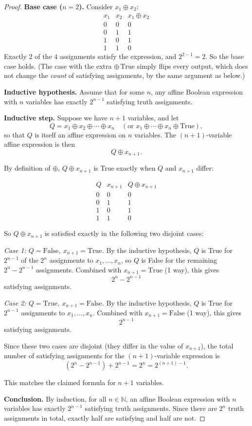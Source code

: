 \documentclass[11pt]{article}
\begin{document}
\begin{proof}
\textbf{Base case ($n=2$).} Consider $x_1\oplus x_2$:
\[
\begin{array}{cc|c}
x_1 & x_2 & x_1\oplus x_2\\
\hline
0&0&0\\
0&1&1\\
1&0&1\\
1&1&0
\end{array}
\]
Exactly $2$ of the $4$ assignments satisfy the expression, and $2^{2-1}=2$. So the base case holds. (The case with the extra $\oplus\,\text{True}$ simply flips every output, which does not change the \emph{count} of satisfying assignments, by the same argument as below.)

\bigskip
\noindent\textbf{Inductive hypothesis.} Assume that for some $n$, any affine Boolean expression with $n$ variables has exactly $2^{n-1}$ satisfying truth assignments.

\bigskip
\noindent\textbf{Inductive step.} Suppose we have $n+1$ variables, and let
\[
Q = x_1\oplus x_2\oplus\cdots\oplus x_n \quad(\text{or } x_1\oplus\cdots\oplus x_n\oplus\text{True}),
\]
so that $Q$ is itself an affine expression on $n$ variables. The $(n+1)$-variable affine expression is then
\[
Q\oplus x_{n+1}.
\]

By definition of $\oplus$, $Q\oplus x_{n+1}$ is True exactly when $Q$ and $x_{n+1}$ differ:

\[
\begin{array}{cc|c}
Q & x_{n+1} & Q\oplus x_{n+1}\\
\hline
0&0&0\\
0&1&1\\
1&0&1\\
1&1&0
\end{array}
\]

So $Q\oplus x_{n+1}$ is satisfied exactly in the following two disjoint cases:

\smallskip
\noindent\textit{Case 1: $Q=\text{False}$, $x_{n+1}=\text{True}$.} By the inductive hypothesis, $Q$ is True for $2^{n-1}$ of the $2^n$ assignments to $x_1,\dots,x_n$, so $Q$ is False for the remaining $2^n-2^{n-1}$ assignments. Combined with $x_{n+1}=\text{True}$ (1 way), this gives
\[
2^n-2^{n-1}
\]
satisfying assignments.

\smallskip
\noindent\textit{Case 2: $Q=\text{True}$, $x_{n+1}=\text{False}$.} By the inductive hypothesis, $Q$ is True for $2^{n-1}$ assignments to $x_1,\dots,x_n$. Combined with $x_{n+1}=\text{False}$ (1 way), this gives
\[
2^{n-1}
\]
satisfying assignments.

\smallskip
Since these two cases are disjoint (they differ in the value of $x_{n+1}$), the total number of satisfying assignments for the $(n+1)$-variable expression is
\[
(2^n - 2^{n-1}) + 2^{n-1} = 2^n = 2^{(n+1)-1}.
\]

This matches the claimed formula for $n+1$ variables.

\bigskip
\noindent\textbf{Conclusion.} By induction, for all $n\in\mathbb{N}$, an affine Boolean expression with $n$ variables has exactly $2^{n-1}$ satisfying truth assignments. Since there are $2^n$ truth assignments in total, exactly half are satisfying and half are not. \qedhere
\end{proof}
\end{document}
